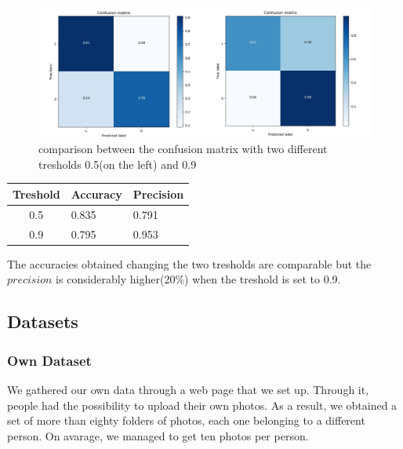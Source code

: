 \begin{figure}
\begin{center}
\includegraphics[width=1\linewidth]{images/cm.jpg}
\end{center}
   \caption{comparison between the confusion matrix with two different tresholds 0.5(on the left) and 0.9}
\label{fig:conf_matrices}
\end{figure}


\begin{table}[]
\centering
\begin{tabular}{|c|ll|}
\hline
Treshold & Accuracy & Precision \\ \hline
0.5                          & 0.835    & 0.791     \\ \hline
0.9                          & 0.795    & 0.953     \\ \hline
\end{tabular}
\end{table}


The accuracies obtained changing the two tresholds are comparable but the $precision$ is considerably higher(20\%) when the treshold is set to 0.9.

\subsection{Datasets}
\subsubsection{Own Dataset}
We gathered our own data through a web page \cite{gdpdataret} that we set up. Through it, people had the possibility to upload their own photos. As a result, we obtained a set of more than eighty folders of photos, each one belonging to a different person. On avarage, we managed to get ten photos per person.
